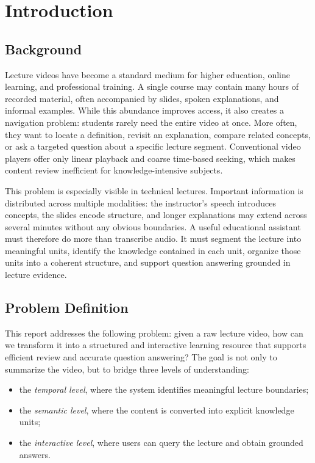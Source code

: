 \section{Introduction}

\subsection{Background}

Lecture videos have become a standard medium for higher education, online learning, and professional training. A single course may contain many hours of recorded material, often accompanied by slides, spoken explanations, and informal examples. While this abundance improves access, it also creates a navigation problem: students rarely need the entire video at once. More often, they want to locate a definition, revisit an explanation, compare related concepts, or ask a targeted question about a specific lecture segment. Conventional video players offer only linear playback and coarse time-based seeking, which makes content review inefficient for knowledge-intensive subjects.

This problem is especially visible in technical lectures. Important information is distributed across multiple modalities: the instructor's speech introduces concepts, the slides encode structure, and longer explanations may extend across several minutes without any obvious boundaries. A useful educational assistant must therefore do more than transcribe audio. It must segment the lecture into meaningful units, identify the knowledge contained in each unit, organize those units into a coherent structure, and support question answering grounded in lecture evidence.

\subsection{Problem Definition}

This report addresses the following problem: given a raw lecture video, how can we transform it into a structured and interactive learning resource that supports efficient review and accurate question answering? The goal is not only to summarize the video, but to bridge three levels of understanding:

\begin{itemize}
\item the \textit{temporal level}, where the system identifies meaningful lecture boundaries;
\item the \textit{semantic level}, where the content is converted into explicit knowledge units;
\item the \textit{interactive level}, where users can query the lecture and obtain grounded answers.
\end{itemize}

